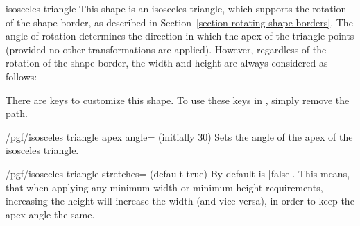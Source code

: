 \begin{shape}{isosceles triangle}
    This shape is an isosceles triangle, which supports the rotation of the
    shape border, as described in Section~\ref{section-rotating-shape-borders}.
    The angle of rotation determines the direction in which the apex of the
    triangle points (provided no other transformations are applied). However,
    regardless of the rotation of the shape border, the width and height are
    always considered as follows:
\begin{codeexample}[preamble={\usetikzlibrary{shapes.geometric}}]
\end{codeexample}

    There are \pgfname{} keys to customize this shape. To use these keys in
    \tikzname, simply remove the  path.

    \begin{key}{/pgf/isosceles triangle apex angle= (initially 30)}
        Sets the angle of the apex of the isosceles triangle.
    \end{key}

    \begin{key}{/pgf/isosceles triangle stretches= (default true)}
        By default  is |false|. This means, that when applying
        any minimum width or minimum height requirements, increasing the height
        will increase the width (and vice versa), in order to keep the apex
        angle the same.
\begin{codeexample}[preamble={\usetikzlibrary{shapes.geometric}}]
\end{codeexample}


\end{key}
\end{shape}
